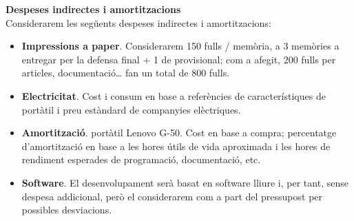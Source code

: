 \noindent \textbf{\large Despeses indirectes i amortitzacions}\\

\noindent Considerarem les següents despeses indirectes i amortitzacions:

\begin{itemize}
\item \textbf{Impressions a paper}. Considerarem 150 fulls / memòria, a 3 memòries a entregar per la defensa final + 1 de provisional; com a afegit, 200 fulls per articles, documentació… fan un total de 800 fulls.
\item \textbf{Electricitat}. Cost i consum en base a referències de característiques de portàtil i preu estàndard de companyies elèctriques.
\item \textbf{Amortització}. portàtil Lenovo G-50. Cost en base a compra; percentatge d’amortització en base a les hores útils de vida aproximada i les hores de rendiment esperades de programació, documentació, etc.
\item \textbf{Software}. El desenvolupament serà basat en software lliure i, per tant, sense despesa addicional, però el considerarem com a part del pressupost per possibles desviacions.
\end{itemize}

\begin{table}[htb]
\centering
\label{PressupostIndirectes}
\caption{Costos indirectes i amortitzacions}
\end{table}


